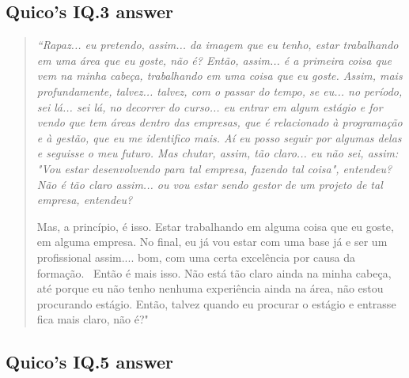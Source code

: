 
\subsection{Quico’s IQ.3 answer}
\label{interview-exc-ss:quico-iq3}

\begin{quote}
    \itshape
    “Rapaz... eu pretendo, assim... da imagem que eu tenho, estar trabalhando em uma área que eu goste, não é? Então, assim... é a primeira coisa que vem na minha cabeça, trabalhando em uma coisa que eu goste. Assim, mais profundamente, talvez... talvez, com o passar do tempo, se eu... no período, sei lá... sei lá, no decorrer do curso... eu entrar em algum estágio e for vendo que tem áreas dentro das empresas, que é relacionado à programação e à gestão, que eu me identifico mais. Aí eu posso seguir por algumas delas e seguisse o meu futuro. Mas chutar, assim, tão claro... eu não sei, assim: "Vou estar desenvolvendo para tal empresa, fazendo tal coisa", entendeu? Não é tão claro assim... ou vou estar sendo gestor de um projeto de tal empresa, entendeu?
    
    Mas, a princípio, é isso. Estar trabalhando em alguma coisa que eu goste, em alguma empresa. No final, eu já vou estar com uma base já e ser um profissional assim.... bom, com uma certa excelência por causa da formação.  Então é mais isso. Não está tão claro ainda na minha cabeça, até porque eu não tenho nenhuma experiência ainda na área, não estou procurando estágio. Então, talvez quando eu procurar o estágio e entrasse fica mais claro, não é?"
\end{quote}


\subsection{Quico’s IQ.5 answer}
\label{interview-exc-ss:quico-iq5}

